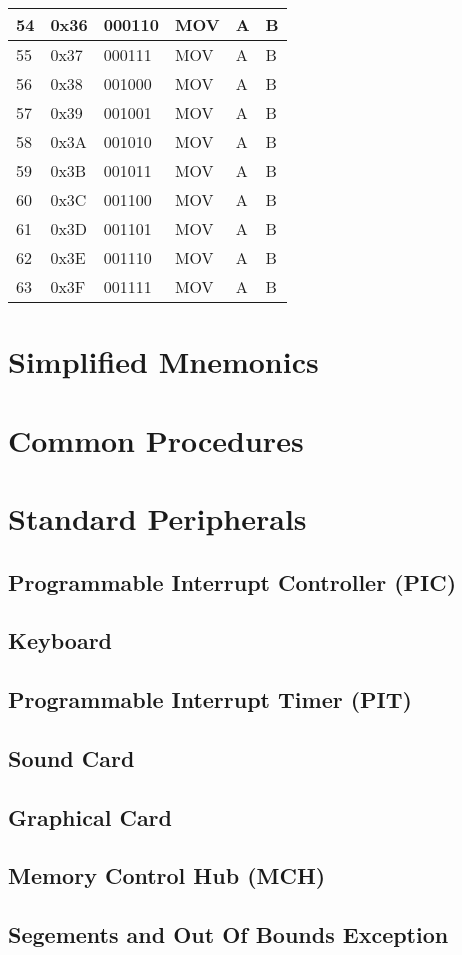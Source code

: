 \documentclass[oneside, a4paper]{memoir}
\begin{document}
\begin{table}[]
\begin{tabular}{|l|l|l|l|l|l|}
54 & 0x36 & 000110 & MOV  & A & B \\ \hline
55 & 0x37 & 000111 & MOV  & A & B \\ \hline
56 & 0x38 & 001000 & MOV  & A & B \\ \hline
57 & 0x39 & 001001 & MOV  & A & B \\ \hline
58 & 0x3A & 001010 & MOV  & A & B \\ \hline
59 & 0x3B & 001011 & MOV  & A & B \\ \hline
60 & 0x3C & 001100 & MOV  & A & B \\ \hline
61 & 0x3D & 001101 & MOV  & A & B \\ \hline
62 & 0x3E & 001110 & MOV  & A & B \\ \hline
63 & 0x3F & 001111 & MOV  & A & B \\ \hline
\end{tabular}
\end{table}

\chapter{Simplified Mnemonics}

\chapter{Common Procedures}

\chapter{Standard Peripherals}
\section{Programmable Interrupt Controller (PIC)}
\section{Keyboard}
\section{Programmable Interrupt Timer (PIT)}
\section{Sound Card}
\section{Graphical Card}
\section{Memory Control Hub (MCH)}
\section{Segements and Out Of Bounds Exception}
\end{document}
